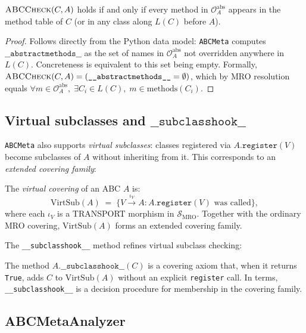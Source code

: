 \documentclass[11pt]{article}
\newcommand{\Clin}[1]{L(#1)}                     %
\newcommand{\MROSite}{\mathcal{S}_{\mathrm{MRO}}} %
\newcommand{\ABCMeta}{\texttt{ABCMeta}}
\newcommand{\AbstractObl}[1]{\mathcal{O}^{\mathrm{abs}}_{#1}}
\newcommand{\VirtSub}[1]{\mathrm{VirtSub}(#1)}
\newcommand{\ABCCheck}{\textsc{ABCCheck}}
\newcommand{\subclasshook}{\texttt{\_\_subclasshook\_\_}}
\begin{document}
\begin{theorem}\label{thm:abc-complete}
  $\ABCCheck(C, A)$ holds if and only if every method in
  $\AbstractObl{A}$ appears in the method table of $C$ (or in any
  class along $\Clin{C}$ before $A$).
\end{theorem}

\begin{proof}
  Follows directly from the Python data model: \ABCMeta{} computes
  $\texttt{\_\_abstractmethods\_\_}$ as the set of names in
  $\AbstractObl{A}$ not overridden anywhere in $\Clin{C}$.
  Concreteness is equivalent to this set being empty.
  Formally, $\ABCCheck(C, A) = (\texttt{\_\_abstractmethods\_\_} = \emptyset)$,
  which by MRO resolution equals $\forall m \in \AbstractObl{A},\;
  \exists C_i \in \Clin{C},\; m \in \mathrm{methods}(C_i)$.
\end{proof}

\subsection{Virtual subclasses and $\subclasshook$}

\ABCMeta{} also supports \emph{virtual subclasses}: classes registered
via $A.\texttt{register}(V)$ become subclasses of $A$ without inheriting
from it.  This corresponds to an \emph{extended covering family}:

\begin{definition}\label{def:virtual-cover}
  The \emph{virtual covering} of an ABC $A$ is:
  \[
    \VirtSub{A} \;=\; \bigl\{ V \xrightarrow{\iota_V} A :
    A.\texttt{register}(V) \text{ was called} \bigr\},
  \]
  where each $\iota_V$ is a TRANSPORT morphism in $\MROSite$.
  Together with the ordinary MRO covering, $\VirtSub{A}$ forms an
  extended covering family.
\end{definition}

The \subclasshook{} method refines virtual subclass checking:

\begin{definition}[$\subclasshook$ axiom]\label{def:subclasshook}
  The method $A.\subclasshook{}(C)$ is a covering axiom that, when it
  returns \texttt{True}, adds $C$ to $\VirtSub{A}$ without an explicit
  \texttt{register} call.  In \JuGeo{} terms, \subclasshook{} is a
  decision procedure for membership in the covering family.
\end{definition}

\subsection{ABCMetaAnalyzer}
\end{document}
